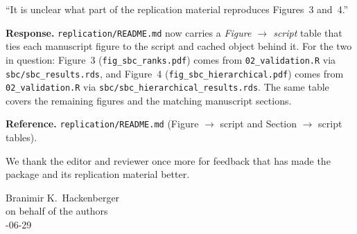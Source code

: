 \documentclass[11pt,a4paper]{article}
\newcommand{\code}[1]{\texttt{#1}}
\begin{document}
\begin{displayquote}
``It is unclear what part of the replication material reproduces
Figures~3 and~4.''
\end{displayquote}

\textbf{Response.} \code{replication/README.md} now carries a
\emph{Figure $\rightarrow$ script} table that ties each manuscript figure
to the script and cached object behind it. For the two in question:
Figure~3 (\code{fig\_sbc\_ranks.pdf}) comes from \code{02\_validation.R}
via \code{sbc/sbc\_results.rds}, and Figure~4
(\code{fig\_sbc\_hierarchical.pdf}) comes from \code{02\_validation.R}
via \code{sbc/sbc\_hierarchical\_results.rds}. The same table covers the
remaining figures and the matching manuscript sections.

\textbf{Reference.} \code{replication/README.md} (Figure $\rightarrow$
script and Section $\rightarrow$ script tables).

\vspace{1em}
\noindent We thank the editor and reviewer once more for feedback that
has made the package and its replication material better.

\vspace{1em}
\noindent Branimir K.\ Hackenberger\\
\noindent on behalf of the authors\\
-06-29
\end{document}
